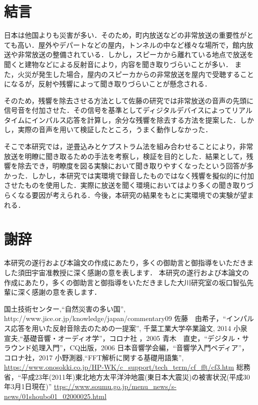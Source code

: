 \documentclass[a4j,11pt]{jsarticle}
\begin{document}
\newpage
\section{結言}
日本は他国よりも災害が多い．そのため，町内放送などの非常放送の重要性がとても高い\cite{oka1}．屋外やデパートなどの屋内，トンネルの中など様々な場所で，館内放送や非常放送の整備されている．しかし，スピーカから離れている地点で放送を聞くと建物などによる反射音により，内容を聞き取りづらいことが多い．
また，火災が発生した場合，屋内のスピーカからの非常放送を屋内で受聴することになるが，反射や残響によって聞き取りづらいことが懸念される．


そのため，残響を除去させる方法として佐藤の研究では非常放送の音声の先頭に信号音を付加させた\cite{oka2}．その信号を基準としてディジタルデバイスによってリアルタイムにインパルス応答を計算し，余分な残響を除去する方法を提案した．しかし，実際の音声を用いて検証したところ，うまく動作しなかった．

そこで本研究では，逆畳込みとケプストラム法を組み合わせることにより，非常放送を明瞭に聞き取るための手法を考察し，検証を目的とした．結果として，残響を除去でき，明瞭度を図る実験において聞き取りやすくなったという回答が多かった．しかし，本研究では実環境で録音したものではなく残響を擬似的に付加させたものを使用した．実際に放送を聞く環境においてはより多くの聞き取りづらくなる要因が考えられる．今後，本研究の結果をもとに実環境での実験が望まれる．

\newpage
\section*{謝辞}
本研究の遂行および本論文の作成にあたり，多くの御助言と御指導をいただきました須田宇宙准教授に深く感謝の意を表します．
本研究の遂行および本論文の作成にあたり，多くの御助言と御指導をいただきました大川研究室の坂口智弘先輩に深く感謝の意を表します．

\newpage

\begin{thebibliography}{99}

国土技術センター,``自然災害の多い国'',
http://www.jice.or.jp/knowledge/japan/commentary09
佐藤　由希子，``インパルス応答を用いた反射音除去のための一提案'', 千葉工業大学卒業論文, 2014
小泉　宣夫,``基礎音響・オーディオ学''，コロナ社 ，2005
青木　直史，``デジタル・サラウンド処理入門''，CQ出版，2006
日本音響学会編，``音響学入門ペディア''，コロナ社，2017
小野測器,``FFT解析に関する基礎用語集'',
\url{https://www.onosokki.co.jp/HP-WK/c_support/tech_term/cf_fft/cf3.htm}
総務省，``平成23年(2011年)東北地方太平洋沖地震(東日本大震災)の被害状況(平成30年3月1日現在)''
\url{ttps://www.soumu.go.jp/menu_news/s-news/01shoubo01_02000025.html}
\end{thebibliography}
\end{document}
